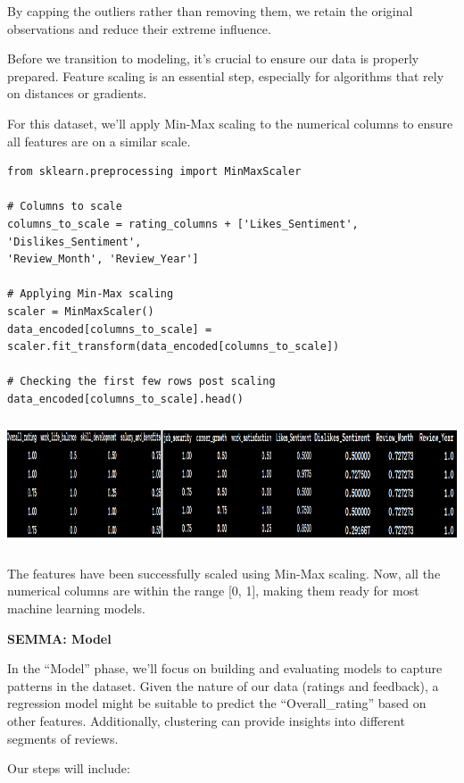 \documentclass[
]{article}
\newcommand{\textcenter}[1]{\begin{center} \vspace{10px}\textbf{\large #1} \end{center}}
\begin{document}
By capping the outliers rather than removing them, we retain the
original observations and reduce their extreme influence.

Before we transition to modeling, it's crucial to ensure our data is
properly prepared. Feature scaling is an essential step, especially for
algorithms that rely on distances or gradients.

For this dataset, we'll apply Min-Max scaling to the numerical columns
to ensure all features are on a similar scale.
\begin{verbatim}
from sklearn.preprocessing import MinMaxScaler

# Columns to scale
columns_to_scale = rating_columns + ['Likes_Sentiment', 'Dislikes_Sentiment',
'Review_Month', 'Review_Year']

# Applying Min-Max scaling
scaler = MinMaxScaler()
data_encoded[columns_to_scale] = scaler.fit_transform(data_encoded[columns_to_scale])

# Checking the first few rows post scaling
data_encoded[columns_to_scale].head()

\end{verbatim}


\includegraphics[width=5.26806in,height=1.49722in]{image13.png}

The features have been successfully scaled using Min-Max scaling. Now,
all the numerical columns are within the range {[}0, 1{]}, making them
ready for most machine learning models.


\textcenter{SEMMA: Model}

In the ``Model'' phase, we'll focus on building and evaluating models to
capture patterns in the dataset. Given the nature of our data (ratings
and feedback), a regression model might be suitable to predict the
``Overall\_rating'' based on other features. Additionally, clustering
can provide insights into different segments of reviews.

Our steps will include:
\end{document}
